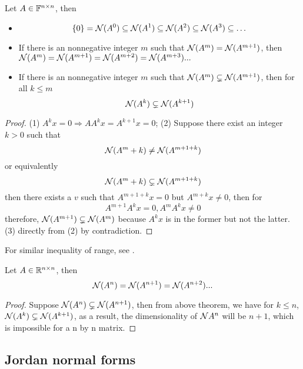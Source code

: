\begin{refsection}
\begin{lemma}
	\cite[242]{axler2015linear}
	Let $A \in \mathbb{F}^{n\times n}$, then
	\begin{itemize}
		\item $$\{0\} = \mathcal{N}(A^0) \subseteq \mathcal{N}(A^1) \subseteq \mathcal{N}(A^2) \subseteq \mathcal{N}(A^3) \subseteq \dots $$
		\item If there is an nonnegative integer $m$ such that $\mathcal{N}(A^m) = \mathcal{N}(A^{m+1})$,
		then $\mathcal{N}(A^m) = \mathcal{N}(A^{m+1}) = \mathcal{N}(A^{m+2}) = \mathcal{N}(A^{m+3}) ...$
		\item If there is an nonnegative integer $m$ such that $\mathcal{N}(A^m) \subsetneq \mathcal{N}(A^{m+1})$, then for all $k \leq m$
		$$\mathcal{N}(A^k) \subsetneq \mathcal{N}(A^{k+1})$$
	\end{itemize}
\end{lemma}


\begin{proof}
	(1) $A^k x = 0 \Rightarrow A A^k x = A^{k+1}x = 0$;
	(2) Suppose there exist an integer $k > 0$ such that 
	$$\mathcal{N}(A^m+k) \neq \mathcal{N}(A^{m+1+k})$$
	or equivalently
	$$\mathcal{N}(A^m+k) \subsetneq \mathcal{N}(A^{m+1+k})$$
	then there exists a $v$ such that $A^{m+1+k}x = 0$ but $A^{m+k}x \neq 0$, then for
	$$A^{m+1}A^{k}x = 0, A^{m}A^k x \neq 0$$
	therefore, $\mathcal{N}(A^{m+1}) \subsetneq \mathcal{N}(A^m)$ because $A^k x$ is in the former but not the latter. 
	(3) directly from (2) by contradiction.
\end{proof}


\begin{remark}
	For similar inequality of range, see \cite[251]{axler2015linear}.
\end{remark}

\begin{lemma}
	Let $A \in \mathbb{R}^{n\times n}$, then
	$$\mathcal{N}(A^n) = \mathcal{N}(A^{n+1}) = \mathcal{N}(A^{n+2})...$$
\end{lemma}

\begin{proof}
	Suppose $\mathcal{N}(A^n) \subsetneq \mathcal{N}(A^{n+1})$, then from above theorem, we have
	for $k \leq n$, $\mathcal{N}(A^k) \subsetneq \mathcal{N}(A^{k+1})$, as a result, the dimensionality of $\mathcal{N}{A^n}$ will be $n+1$, which is impossible for a n by n matrix.
\end{proof}


\subsection{Jordan normal forms}


\end{refsection}
